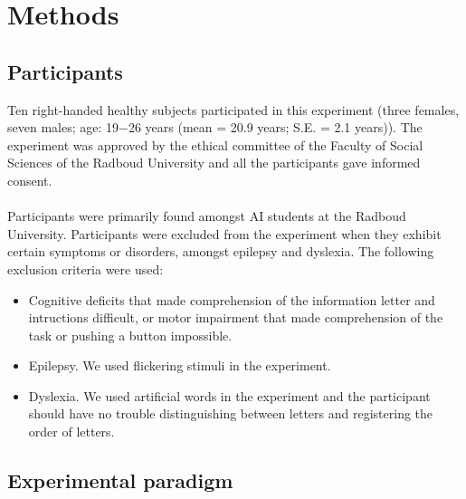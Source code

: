 \section{Methods}
\label{sec:method}

\subsection{Participants}
Ten right-handed healthy subjects participated in this experiment (three females, seven males; age: 19$-$26 years (mean = 20.9 years; S.E. = 2.1 years)). The experiment was approved by the ethical committee of the Faculty of Social Sciences of the Radboud University and all the participants gave informed consent.\\
\\
Participants were primarily found amongst AI students at the Radboud University. Participants were excluded from the experiment when they exhibit certain symptoms or disorders, amongst epilepsy and dyslexia. The following exclusion criteria were used:
\begin{itemize}
	\item Cognitive deficits that made comprehension of the information letter and intructions difficult, or motor impairment that made comprehension of the task or pushing a button impossible.
	\item Epilepsy. We used flickering stimuli in the experiment.
	\item Dyslexia. We used artificial words in the experiment and the participant should have no trouble distinguishing between letters and registering the order of letters.
\end{itemize}

\subsection{Experimental paradigm}





